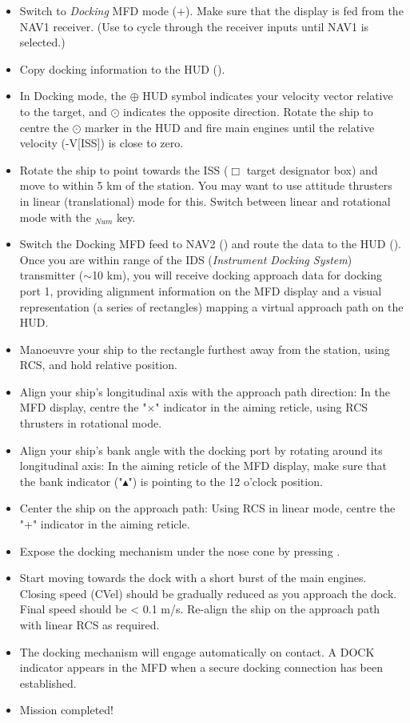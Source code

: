 \documentclass[Orbiter User Manual.tex]{subfiles}
\begin{document}
\begin{itemize}
\item Switch to \textit{Docking} MFD mode (\Shift{}+\Shift{}). Make sure that the display is fed from the NAV1 receiver. (Use \Shift{} to cycle through the receiver inputs until NAV1 is selected.)
\item Copy docking information to the HUD (\Shift{}).
\item In Docking mode, the $\oplus$ HUD symbol indicates your velocity vector relative to the target, and $\odot$ indicates the opposite direction. Rotate the ship to centre the $\odot$ marker in the HUD and fire main engines until the relative velocity (-V[ISS]) is close to zero.
\item Rotate the ship to point towards the ISS ($\Box$ target designator box) and move to within 5 km of the station. You may want to use attitude thrusters in linear (translational) mode for this. Switch between linear and rotational mode with the \keystroke{/}$_{Num}$ key.
\item Switch the Docking MFD feed to NAV2 (\Shift{}) and route the data to the HUD (\Shift{}). Once you are within range of the IDS (\textit{Instrument Docking System}) transmitter ($\sim$10 km), you will receive docking approach data for docking port 1, providing alignment information on the MFD display and a visual representation (a series of rectangles) mapping a virtual approach path on the HUD.
\item Manoeuvre your ship to the rectangle furthest away from the station, using RCS, and hold relative position.
\item Align your ship's longitudinal axis with the approach path direction: In the MFD display, centre the "$\times$" indicator in the aiming reticle, using RCS thrusters in rotational mode.
\item Align your ship's bank angle with the docking port by rotating around its longitudinal axis: In the aiming reticle of the MFD display, make sure that the bank indicator ("$\blacktriangle$") is pointing to the 12 o'clock position.
\item Center the ship on the approach path: Using RCS in linear mode, centre the "+" indicator in the aiming reticle.
\item Expose the docking mechanism under the nose cone by pressing .
\item Start moving towards the dock with a short burst of the main engines. Closing speed (CVel) should be gradually reduced as you approach the dock. Final speed should be < 0.1 m/s. Re-align the ship on the approach path with linear RCS as required.
\item The docking mechanism will engage automatically on contact. A DOCK indicator appears in the MFD when a secure docking connection has been established.
\item Mission completed!
\end{itemize}
\end{document}
